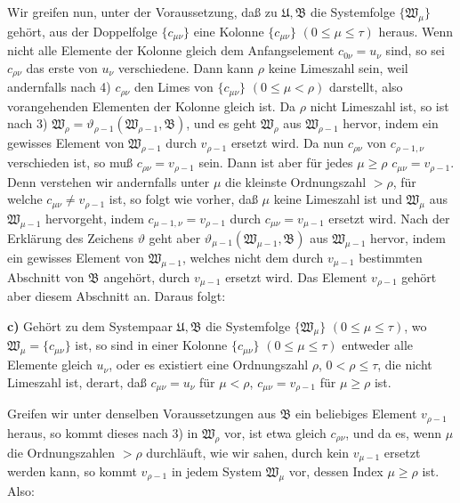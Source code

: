 Wir greifen nun, unter der Voraussetzung, daß zu \(\mathfrak U,\mathfrak B\) die Systemfolge \(\{\mathfrak W_\mu\}\) gehört, aus der Doppelfolge \(\{c_{\mu\nu}\}\) eine Kolonne \(\{c_{\mu\nu}\}\) \((0\leq\mu\leq\tau)\) heraus. Wenn nicht alle Elemente der Kolonne gleich dem Anfangselement \(c_{0\nu}=u_\nu\) sind, so sei \(c_{\rho\nu}\) das erste von \(u_\nu\) verschiedene. Dann kann \(\rho\) keine Limeszahl sein, weil andernfalls nach 4) \(c_{\rho\nu}\) den Limes von \(\{c_{\mu\nu}\}\) \((0\leq\mu<\rho)\) darstellt, also vorangehenden Elementen der Kolonne gleich ist. Da \(\rho\) nicht Limeszahl ist, so ist nach 3) \(\mathfrak W_\rho=\vartheta_{\rho-1}(\mathfrak W_{\rho-1},\mathfrak B)\), und es geht \(\mathfrak W_\rho\) aus \(\mathfrak W_{\rho-1}\) hervor, indem ein gewisses Element von \(\mathfrak W_{\rho-1}\) durch \(v_{\rho-1}\) ersetzt wird. Da nun \(c_{\rho\nu}\) von \(c_{\rho-1,\nu}\) verschieden ist, so muß \(c_{\rho\nu}=v_{\rho-1}\) sein. Dann ist aber für jedes \(\mu\geq\rho\) \(c_{\mu\nu}=v_{\rho-1}\). Denn verstehen wir andernfalls unter \(\mu\) die kleinste Ordnungszahl \(>\rho\), für welche \(c_{\mu\nu}\neq v_{\rho-1}\) ist, so folgt wie vorher, daß \(\mu\) keine Limeszahl ist und \(\mathfrak W_\mu\) aus \(\mathfrak W_{\mu-1}\) hervorgeht, indem \(c_{\mu-1,\nu}=v_{\rho-1}\) durch \(c_{\mu\nu}=v_{\mu-1}\) ersetzt wird. Nach der Erklärung des Zeichens \(\vartheta\) geht aber \(\vartheta_{\mu-1}(\mathfrak W_{\mu-1},\mathfrak B)\) aus \(\mathfrak W_{\mu-1}\) hervor, indem ein gewisses Element von \(\mathfrak W_{\mu-1}\), welches nicht dem durch \(v_{\mu-1}\) bestimmten Abschnitt von \(\mathfrak B\) angehört, durch \(v_{\mu-1}\) ersetzt wird. Das Element \(v_{\rho-1}\) gehört aber diesem Abschnitt an. Daraus folgt:

\textbf{c)} Gehört zu dem Systempaar \(\mathfrak U,\mathfrak B\) die Systemfolge \(\{\mathfrak W_\mu\}\) \((0\leq\mu\leq\tau)\), wo \(\mathfrak W_\mu=\{c_{\mu\nu}\}\) ist, so sind in einer Kolonne \(\{c_{\mu\nu}\}\) \((0\leq\mu\leq\tau)\) entweder alle Elemente gleich \(u_\nu\), oder es existiert eine Ordnungszahl \(\rho\), \(0<\rho\leq\tau\), die nicht Limeszahl ist, derart, daß \(c_{\mu\nu}=u_\nu\) für \(\mu<\rho\), \(c_{\mu\nu}=v_{\rho-1}\) für \(\mu\geq\rho\) ist.

Greifen wir unter denselben Voraussetzungen aus \(\mathfrak B\) ein beliebiges Element \(v_{\rho-1}\) heraus, so kommt dieses nach 3) in \(\mathfrak W_\rho\) vor, ist etwa gleich \(c_{\rho\nu}\), und da es, wenn \(\mu\) die Ordnungszahlen \(>\rho\) durchläuft, wie wir sahen, durch kein \(v_{\mu-1}\) ersetzt werden kann, so kommt \(v_{\rho-1}\) in jedem System \(\mathfrak W_\mu\) vor, dessen Index \(\mu\geq\rho\) ist. Also:

